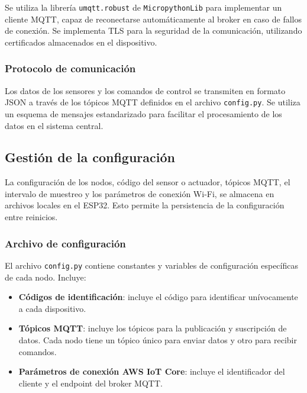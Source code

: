 Se utiliza la librería \texttt{umqtt.robust} de \texttt{MicropythonLib}
\cite{MicropythonLib} para implementar un cliente MQTT, capaz de reconectarse
automáticamente al broker en caso de fallos de conexión. Se implementa TLS para
la seguridad de la comunicación, utilizando certificados almacenados en el
dispositivo.

\subsubsection{Protocolo de comunicación}

Los datos de los sensores y los comandos de control se transmiten en formato
JSON a través de los tópicos MQTT definidos en el archivo \texttt{config.py}.
Se utiliza un esquema de mensajes estandarizado para facilitar el procesamiento
de los datos en el sistema central.


\subsection{Gestión de la configuración}

La configuración de los nodos, código del sensor o actuador, tópicos MQTT, el
intervalo de muestreo y los parámetros de conexión Wi-Fi, se almacena en
archivos locales en el ESP32. Esto permite la persistencia de la configuración
entre reinicios.

\subsubsection{Archivo de configuración}

El archivo \texttt{config.py} contiene constantes y variables de configuración
específicas de cada nodo. Incluye:

\begin{itemize}
    \item \textbf{Códigos de identificación}: incluye el código para identificar unívocamente
          a cada dispositivo.
    \item \textbf{Tópicos MQTT}: incluye los tópicos para la publicación y
          suscripción de datos. Cada nodo tiene un tópico único para enviar datos
          y otro para recibir comandos.
    \item \textbf{Parámetros de conexión AWS IoT Core}: incluye el identificador del cliente y el
          endpoint del broker MQTT.
\end{itemize}

